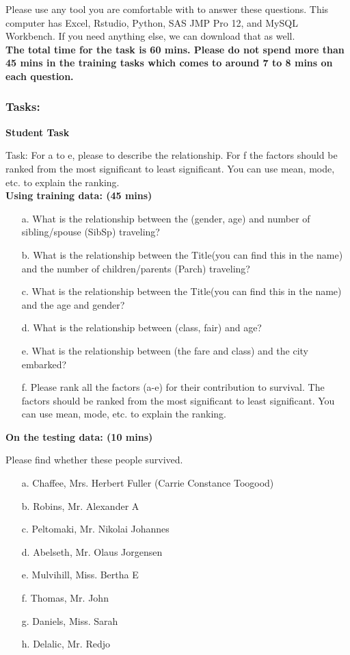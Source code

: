 \noindent
Please use any tool you are comfortable with to answer these questions. This computer has Excel, Rstudio, Python, SAS JMP Pro 12, and MySQL Workbench. If you need anything else, we can download that as well.  \\

\noindent
\textbf{The total time for the task is 60 mins. Please do not spend more than 45 mins in the training tasks which comes to around 7 to 8 mins on each question.} 

\subsubsection*{\large Tasks:}

\textbf{Student Task}

\noindent
Task: For a to e, please to describe the relationship. For f the factors should be ranked from the most significant to least significant. You can use mean, mode, etc. to explain the ranking. \\

\noindent
\textbf{Using training data: (45 mins)}
\begin{itemize}
    \item[a.] What is the relationship between the (gender, age) and number of sibling/spouse (SibSp) traveling? 
    \item[b.] What is the  relationship between the Title(you can find this in the name) and the number of children/parents (Parch) traveling? 
    \item[c.] What is the relationship between the Title(you can find this in the name) and the age and gender? 
    \item[d.] What is the relationship between (class, fair) and age? 
    \item[e.] What is the relationship between (the fare and class) and the city embarked? 
    \item[f.] Please rank all the factors (a-e) for their contribution to survival. The factors should be ranked from the most significant to least significant. You can use mean, mode, etc. to explain the ranking.
\end{itemize}

\noindent
\textbf{On the testing data: (10 mins)}

Please find whether these people survived.

\begin{itemize}
    \item[a.] Chaffee, Mrs. Herbert Fuller (Carrie Constance Toogood)
    \item[b.] Robins, Mr. Alexander A
    \item[c.] Peltomaki, Mr. Nikolai Johannes 
    \item[d.] Abelseth, Mr. Olaus Jorgensen
    \item[e.] Mulvihill, Miss. Bertha E
    \item[f.] Thomas, Mr. John
    \item[g.] Daniels, Miss. Sarah
    \item[h.] Delalic, Mr. Redjo
\end{itemize}

